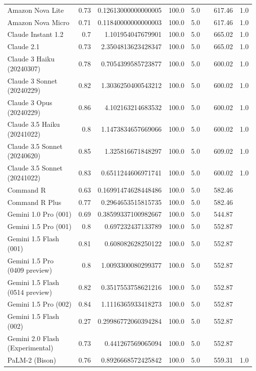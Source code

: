 \begin{table}[htp]
{\begin{tabular}{lrrrrrrr}
Amazon Nova Lite & 0.73 & 0.12613000000000005 & 100.0 & 5.0 &  & 617.46 & 1.0 \\
Amazon Nova Micro & 0.71 & 0.11840000000000003 & 100.0 & 5.0 &  & 617.46 & 1.0 \\
Claude Instant 1.2 & 0.7 & 1.101954047679901 & 100.0 & 5.0 &  & 665.02 & 1.0 \\
Claude 2.1 & 0.73 & 2.3504813623428347 & 100.0 & 5.0 &  & 665.02 & 1.0 \\
Claude 3 Haiku (20240307) & 0.78 & 0.7054399585723877 & 100.0 & 5.0 &  & 600.02 & 1.0 \\
Claude 3 Sonnet (20240229) & 0.82 & 1.3036250400543212 & 100.0 & 5.0 &  & 600.02 & 1.0 \\
Claude 3 Opus (20240229) & 0.86 & 4.102163214683532 & 100.0 & 5.0 &  & 600.02 & 1.0 \\
Claude 3.5 Haiku (20241022) & 0.8 & 1.1473834657669066 & 100.0 & 5.0 &  & 600.02 & 1.0 \\
Claude 3.5 Sonnet (20240620) & 0.85 & 1.325816671848297 & 100.0 & 5.0 &  & 609.02 & 1.0 \\
Claude 3.5 Sonnet (20241022) & 0.83 & 0.6511244606971741 & 100.0 & 5.0 &  & 600.02 & 1.0 \\
Command R & 0.63 & 0.16991474628448486 & 100.0 & 5.0 &  & 582.46 &  \\
Command R Plus & 0.77 & 0.2964653515815735 & 100.0 & 5.0 &  & 582.46 &  \\
Gemini 1.0 Pro (001) & 0.69 & 0.38599337100982667 & 100.0 & 5.0 &  & 544.87 &  \\
Gemini 1.5 Pro (001) & 0.8 & 0.697232437133789 & 100.0 & 5.0 &  & 552.87 &  \\
Gemini 1.5 Flash (001) & 0.81 & 0.608082628250122 & 100.0 & 5.0 &  & 552.87 &  \\
Gemini 1.5 Pro (0409 preview) & 0.8 & 1.0093300080299377 & 100.0 & 5.0 &  & 552.87 &  \\
Gemini 1.5 Flash (0514 preview) & 0.82 & 0.3517553758621216 & 100.0 & 5.0 &  & 552.87 &  \\
Gemini 1.5 Pro (002) & 0.84 & 1.1116365933418273 & 100.0 & 5.0 &  & 552.87 &  \\
Gemini 1.5 Flash (002) & 0.27 & 0.29986772060394284 & 100.0 & 5.0 &  & 552.87 &  \\
Gemini 2.0 Flash (Experimental) & 0.73 & 0.441267569065094 & 100.0 & 5.0 &  & 552.87 &  \\
PaLM-2 (Bison) & 0.76 & 0.8926668572425842 & 100.0 & 5.0 &  & 559.31 & 1.0 \\

\end{tabular}}
\end{table}
